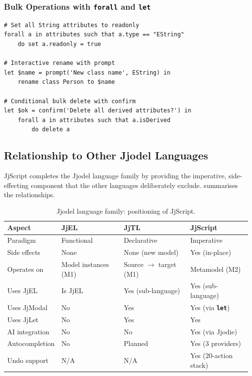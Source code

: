 \documentclass[11pt,a4paper]{article}
\newcommand{\jjmodal}{\textsf{JjModal}}
\newcommand{\jjlet}{\textsf{JjLet}}
\newcommand{\jjscript}{\textsf{JjScript}}
\newcommand{\jjel}{\textsf{JjEL}}
\newcommand{\jjtl}{\textsf{JjTL}}
\newcommand{\kw}[1]{\texttt{\textbf{#1}}}
\begin{document}
\subsubsection{Bulk Operations with \texttt{forall} and \texttt{let}}

\begin{lstlisting}[style=jjscript,caption={Advanced JjScript with iteration and bindings}]
# Set all String attributes to readonly
forall a in attributes such that a.type == "EString"
    do set a.readonly = true

# Interactive rename with prompt
let $name = prompt('New class name', EString) in
    rename class Person to $name

# Conditional bulk delete with confirm
let $ok = confirm('Delete all derived attributes?') in
    forall a in attributes such that a.isDerived
        do delete a
\end{lstlisting}


\subsection{Relationship to Other Jjodel Languages}\label{sec:jjscript-relations}

\jjscript{} completes the Jjodel language family by providing the
imperative, side-effecting component that the other languages deliberately
exclude.  summarises the relationships.

\begin{table}[H]
\centering
\small
\caption{Jjodel language family: positioning of \jjscript{}.}
\label{tab:jjscript-family}
\begin{tabularx}{\textwidth}{@{}lXXX@{}}
\toprule
\textbf{Aspect} & \textbf{\jjel{}} & \textbf{\jjtl{}} & \textbf{\jjscript{}} \\
\midrule
Paradigm & Functional & Declarative & Imperative \\
Side effects & None & None (new model) & Yes (in-place) \\
Operates on & Model instances (M1) & Source $\to$ target (M1) & Metamodel (M2) \\
Uses \jjel{} & Is \jjel{} & Yes (sub-language) & Yes (sub-language) \\
Uses \jjmodal{} & No & Yes & Yes (via \kw{let}) \\
Uses \jjlet{} & No & Yes & Yes \\
AI integration & No & No & Yes (via Jjodie) \\
Autocompletion & No & Planned & Yes (3 providers) \\
Undo support & N/A & N/A & Yes (20-action stack) \\
\bottomrule
\end{tabularx}
\end{table}
\end{document}
